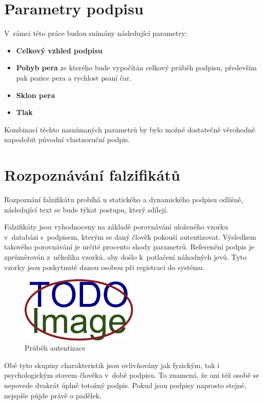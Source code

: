 \newpage

\section{Parametry podpisu}
V~rámci této práce budou snímány následující parametry:
\begin{itemize}
  \item \textbf{Celkový vzhled podpisu}
  \item \textbf{Pohyb pera} ze kterého bude vypočítán celkový průběh podpisu, především pak pozice pera a rychlost psaní čar. %
  \item \textbf{Sklon pera} 
  \item \textbf{Tlak}
\end{itemize}
Kombinací těchto nasnímaných parametrů by bylo možné dostatečně věrohodně napodobit původní vlastnoruční podpis. 

\section{Rozpoznávání falzifikátů}
Rozpoznání falzifikátu probíhá u statického a dynamického podpisu odlišně, následující text se bude týkat postupu, který sdílejí.

Falzifikáty jsou vyhodnoceny na základě porovnávání uloženého vzorku v~databázi s~podpisem, kterým se daný člověk pokouší autentizovat.
Výsledkem takového porovnávání je určité procento shody parametrů.
Referenční podpis je zprůměrován z~několika vzorků, aby došlo k~potlačení náhodných jevů. %
Tyto vzorky jsou poskytnuté danou osobou při registraci do systému.

\begin{figure}[h]
  \centering
  \includegraphics[width=0.5\textwidth]{obrazky-figures/placeholder.pdf}
  \caption{Průběh autentizace}
  \label{fig:my-pdf}
\end{figure}

Obě tyto skupiny charakteristik jsou ovlivňovány jak fyzickým, tak i psychologickým stavem člověka v~době podpisu.
To znamená, že ani též osobě se nepovede dvakrát úplně totožný podpis.
Pokud jsou podpisy naprosto stejné, nejspíše půjde právě o padělek.

